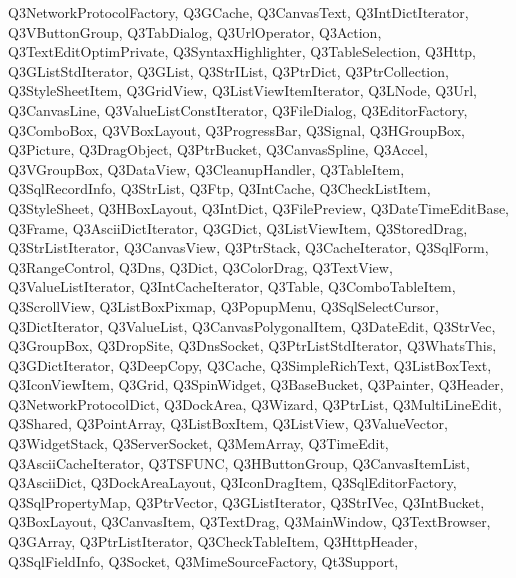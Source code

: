 {{    Q3NetworkProtocolFactory,%
    Q3GCache,%
    Q3CanvasText,%
    Q3IntDictIterator,%
    Q3VButtonGroup,%
    Q3TabDialog,%
    Q3UrlOperator,%
    Q3Action,%
    Q3TextEditOptimPrivate,%
    Q3SyntaxHighlighter,%
    Q3TableSelection,%
    Q3Http,%
    Q3GListStdIterator,%
    Q3GList,%
    Q3StrIList,%
    Q3PtrDict,%
    Q3PtrCollection,%
    Q3StyleSheetItem,%
    Q3GridView,%
    Q3ListViewItemIterator,%
    Q3LNode,%
    Q3Url,%
    Q3CanvasLine,%
    Q3ValueListConstIterator,%
    Q3FileDialog,%
    Q3EditorFactory,%
    Q3ComboBox,%
    Q3VBoxLayout,%
    Q3ProgressBar,%
    Q3Signal,%
    Q3HGroupBox,%
    Q3Picture,%
    Q3DragObject,%
    Q3PtrBucket,%
    Q3CanvasSpline,%
    Q3Accel,%
    Q3VGroupBox,%
    Q3DataView,%
    Q3CleanupHandler,%
    Q3TableItem,%
    Q3SqlRecordInfo,%
    Q3StrList,%
    Q3Ftp,%
    Q3IntCache,%
    Q3CheckListItem,%
    Q3StyleSheet,%
    Q3HBoxLayout,%
    Q3IntDict,%
    Q3FilePreview,%
    Q3DateTimeEditBase,%
    Q3Frame,%
    Q3AsciiDictIterator,%
    Q3GDict,%
    Q3ListViewItem,%
    Q3StoredDrag,%
    Q3StrListIterator,%
    Q3CanvasView,%
    Q3PtrStack,%
    Q3CacheIterator,%
    Q3SqlForm,%
    Q3RangeControl,%
    Q3Dns,%
    Q3Dict,%
    Q3ColorDrag,%
    Q3TextView,%
    Q3ValueListIterator,%
    Q3IntCacheIterator,%
    Q3Table,%
    Q3ComboTableItem,%
    Q3ScrollView,%
    Q3ListBoxPixmap,%
    Q3PopupMenu,%
    Q3SqlSelectCursor,%
    Q3DictIterator,%
    Q3ValueList,%
    Q3CanvasPolygonalItem,%
    Q3DateEdit,%
    Q3StrVec,%
    Q3GroupBox,%
    Q3DropSite,%
    Q3DnsSocket,%
    Q3PtrListStdIterator,%
    Q3WhatsThis,%
    Q3GDictIterator,%
    Q3DeepCopy,%
    Q3Cache,%
    Q3SimpleRichText,%
    Q3ListBoxText,%
    Q3IconViewItem,%
    Q3Grid,%
    Q3SpinWidget,%
    Q3BaseBucket,%
    Q3Painter,%
    Q3Header,%
    Q3NetworkProtocolDict,%
    Q3DockArea,%
    Q3Wizard,%
    Q3PtrList,%
    Q3MultiLineEdit,%
    Q3Shared,%
    Q3PointArray,%
    Q3ListBoxItem,%
    Q3ListView,%
    Q3ValueVector,%
    Q3WidgetStack,%
    Q3ServerSocket,%
    Q3MemArray,%
    Q3TimeEdit,%
    Q3AsciiCacheIterator,%
    Q3TSFUNC,%
    Q3HButtonGroup,%
    Q3CanvasItemList,%
    Q3AsciiDict,%
    Q3DockAreaLayout,%
    Q3IconDragItem,%
    Q3SqlEditorFactory,%
    Q3SqlPropertyMap,%
    Q3PtrVector,%
    Q3GListIterator,%
    Q3StrIVec,%
    Q3IntBucket,%
    Q3BoxLayout,%
    Q3CanvasItem,%
    Q3TextDrag,%
    Q3MainWindow,%
    Q3TextBrowser,%
    Q3GArray,%
    Q3PtrListIterator,%
    Q3CheckTableItem,%
    Q3HttpHeader,%
    Q3SqlFieldInfo,%
    Q3Socket,%
    Q3MimeSourceFactory,%
    Qt3Support,%
}}

